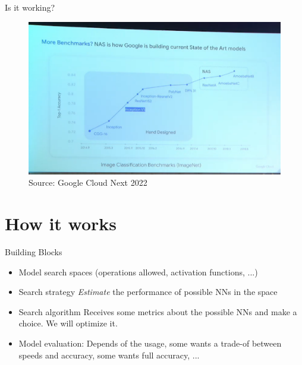 \documentclass{beamer}
\begin{document}
\begin{frame}{Is it working?}

\centering
\begin{figure}
    \centering
    \includegraphics[width=\linewidth]{GOOGLE-2.png}
    \caption{Source: Google Cloud Next 2022}
    \label{fig:enter-label}
\end{figure}


\end{frame}

\section{How it works}

\begin{frame}{Building Blocks}
\begin{itemize}
    \item{\textcolor{mBlue}{Model search spaces} (operations allowed, activation functions, ...)}
    \item{\textcolor{mBlue}{Search strategy} \emph{Estimate} the performance of possible NNs in the space}
    \item{\textcolor{mBlue}{Search algorithm} Receives some metrics about the possible NNs and make a choice. We will optimize it.}
    \item{\textcolor{mBlue}{Model evaluation}: Depends of the usage, some wants a trade-of between speeds and accuracy, some wants full accuracy, ...}
\end{itemize}
\end{frame}
\end{document}
